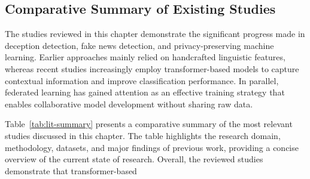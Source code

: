 \subsection{Comparative Summary of Existing Studies}

The studies reviewed in this chapter demonstrate the significant progress made
in deception detection, fake news detection, and privacy-preserving machine
learning. Earlier approaches mainly relied on handcrafted linguistic features,
whereas recent studies increasingly employ transformer-based models to capture
contextual information and improve classification performance. In parallel,
federated learning has gained attention as an effective training strategy that
enables collaborative model development without sharing raw data.

Table~\ref{tab:lit-summary} presents a comparative summary of the most relevant
studies discussed in this chapter. The table highlights the research domain,
methodology, datasets, and major findings of previous work, providing a concise
overview of the current state of research.
Overall, the reviewed studies demonstrate that transformer-based 

